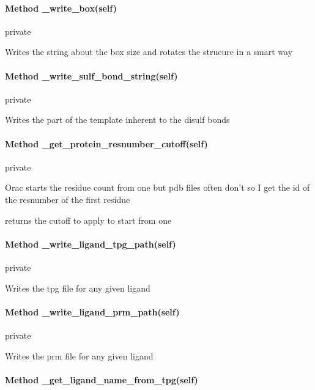         \paragraph{Method \_write\_box(self)}
            
            private

            Writes the string about the box size
            and rotates the strucure in a smart way

        \paragraph{Method \_write\_sulf\_bond\_string(self)}
        
            private
            
            Writes the part of the template inherent to the disulf bonds


        \paragraph{Method \_get\_protein\_resnumber\_cutoff(self)}
        
            private
            
            Orac starts the residue count from one
            but pdb files often don't
            so I get the id of the resnumber of the first residue
            
            returns the cutoff to apply to start from one

        
        \paragraph{Method \_write\_ligand\_tpg\_path(self)}
            
            private
            
            Writes the tpg file for any given ligand


        \paragraph{Method \_write\_ligand\_prm\_path(self)}
        
            private
            
            Writes the prm file for any given ligand


        \paragraph{Method \_get\_ligand\_name\_from\_tpg(self)}
        
